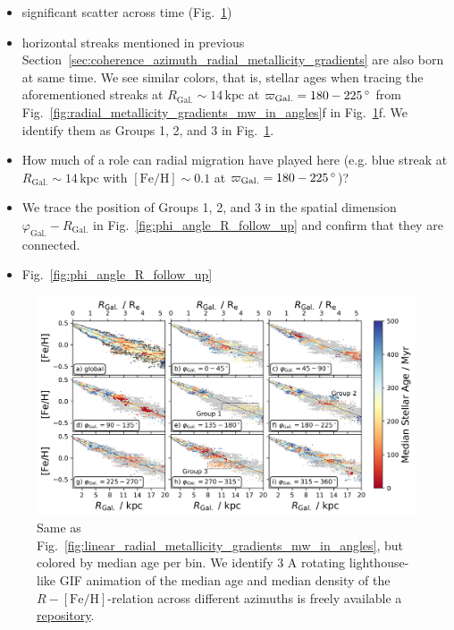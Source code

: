\documentclass[fleqn,usenatbib]{mnras}
\begin{document}
\begin{itemize}
    \item significant scatter across time (Fig.~\ref{fig:radial_metallicity_gradients_mw_in_angles_age})
    \item horizontal streaks mentioned in previous Section~\ref{sec:coherence_azimuth_radial_metallicity_gradients} are also born at same time. We see similar colors, that is, stellar ages when tracing the aforementioned streaks at $R_\mathrm{Gal.} \sim 14\,\mathrm{kpc}$ at $\varpi_\mathrm{Gal.} = 180-225\,\mathrm{\degree}$ from Fig.~\ref{fig:radial_metallicity_gradients_mw_in_angles}f in Fig.~\ref{fig:radial_metallicity_gradients_mw_in_angles_age}f. We identify them as Groups 1, 2, and 3 in Fig.~\ref{fig:radial_metallicity_gradients_mw_in_angles_age}.
    \item How much of a role can radial migration have played here (e.g. blue streak at $R_\mathrm{Gal.} \sim 14\,\mathrm{kpc}$ with $\mathrm{[Fe/H]} \sim 0.1$ at $\varpi_\mathrm{Gal.} = 180-225\,\mathrm{\degree}$)?
    \item We trace the position of Groups 1, 2, and 3 in the spatial dimension $\varphi_\mathrm{Gal.}-R_\mathrm{Gal.}$ in Fig.~\ref{fig:phi_angle_R_follow_up} and confirm that they are connected.
    \item Fig.~\ref{fig:phi_angle_R_follow_up} 
\end{itemize}

\begin{figure}
    \centering
    \includegraphics[width=\textwidth]{figures/radial_metallicity_gradients_mw_in_angles_age.png}
    \caption{Same as Fig.~\ref{fig:linear_radial_metallicity_gradients_mw_in_angles}, but colored by median age per bin. We identify 3  A rotating lighthouse-like GIF animation of the median age and median density of the $R-\mathrm{[Fe/H]}$-relation across different azimuths is freely available a \href{https://github.com/svenbuder/nihao_radial_metallicity_gradients/blob/main/figures/xyz_rfeh.gif}{repository}.}
    \label{fig:radial_metallicity_gradients_mw_in_angles_age}
\end{figure}
\end{document}
